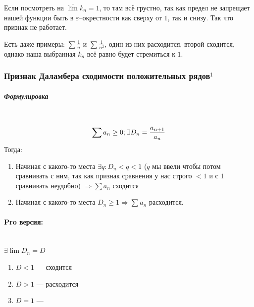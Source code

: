 \documentclass{article}
\def\letus{%
\mathord{\setbox0=\hbox{$\exists$}%
         \hbox{\kern 0.125\wd0%
               \vbox to \ht0{%
                  \hrule width 0.75\wd0%
                  \vfill%
                  \hrule width 0.75\wd0}%
               \vrule height \ht0%
               \kern 0.125\wd0}%
       }%
        }
\let\vanillaparagraph\paragraph
\let\vanillasubparagraph\subparagraph
\renewcommand{\paragraph}[1]{\vanillaparagraph{#1}\mbox{}\\}
\renewcommand{\subparagraph}[1]{\vanillasubparagraph{#1}\mbox{}\\}
\begin{document}
Если посмотреть на $\overline{\lim} k_n = 1$, то там всё грустно, так как предел не запрещает нашей функции быть в $\varepsilon$--окрестности как сверху от $1$, так и снизу. Так что признак не работает. 

Есть даже примеры: $\sum \frac{1}{n}$ и $\sum \frac{1}{n^2}$, один из них расходится, второй сходится, однако наша выбранная $k_n$ всё равно будет стремиться к $1$.


\subsubsection{Признак Даламбера сходимости положительных рядов\texorpdfstring{$^1$}{}}
\subparagraph{Формулировка}
$$
\sum a_n \ge 0; \letus D_n = \frac{a_{n+1}}{a_n}
$$
Тогда:
\begin{enumerate}
    \item Начиная с какого-то места $\exists q : D_n < q < 1$ ($q$ мы ввели чтобы потом сравнивать с ним, так как признак сравнения у нас строго $<1$ и с $1$ сравнивать неудобно) $\Rightarrow \sum a_n$ сходится
    \item Начиная с какого-то места $D_n \ge 1 \Rightarrow \sum a_n$ расходится.
\end{enumerate}
\paragraph{Pro версия:}
$\exists \lim D_n = D$
\begin{enumerate}
    \item $D < 1$ --- сходится
    \item $D > 1$ --- расходится
    \item $D = 1$ --- \Frowny
\end{enumerate}
\end{document}

